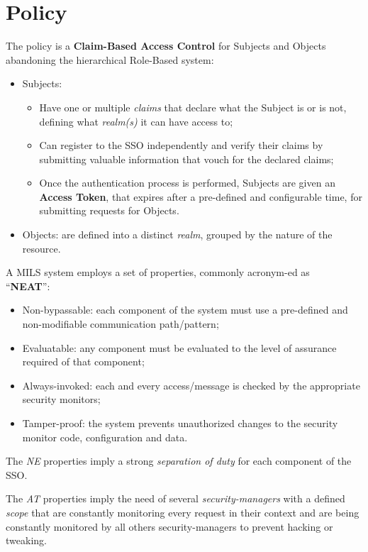 \documentclass{article}
\begin{document}
\newpage

\section{Policy}
The policy is a \textbf{Claim-Based Access Control} for Subjects and Objects abandoning the hierarchical Role-Based system:

\begin{itemize}
    \item Subjects:
    \begin{itemize}
        \item Have one or multiple \textit{claims} that declare what the Subject is or is not, defining what \textit{realm(s)} it can have access to;
        \item Can register to the SSO independently and verify their claims by submitting valuable information that vouch for the declared claims;
        \item Once the authentication process is performed, Subjects are given an \textbf{Access Token}, that expires after a pre-defined and configurable time, for submitting requests for Objects.
    \end{itemize}
    \item Objects: are defined into a distinct \textit{realm}, grouped by the nature of the resource.
\end{itemize}


A MILS system employs a set of properties, commonly acronym-ed as \\
``\textbf{NEAT}''\cite{NEAT}:

\begin{itemize}
    \item Non-bypassable: each component of the system must use a pre-defined and non-modifiable communication path/pattern;
    \item Evaluatable: any component must be evaluated to the level of assurance required of that component;
    \item Always-invoked: each and every access/message is checked by the appropriate security monitors;
    \item Tamper-proof: the system prevents unauthorized changes to the security monitor code, configuration and data.
\end{itemize}


The \textit{NE} properties imply a strong \textit{separation of duty} for each component of the SSO.

The \textit{AT} properties imply the need of several \textit{security-managers} with a defined \textit{scope} that are constantly monitoring every request in their context and are being constantly monitored by all others security-managers to prevent hacking or tweaking.
\end{document}
